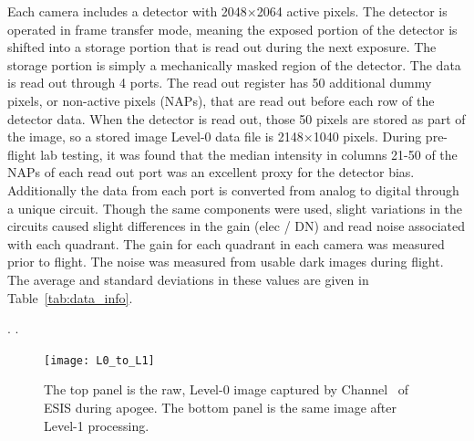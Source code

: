 	    Each camera includes a detector with 2048$\times$2064 active pixels.  The detector is operated in frame transfer mode, meaning the exposed portion of the detector is shifted into a storage portion that is read out during the next exposure. The storage portion is simply a mechanically masked region of the detector. The data is read out through 4 ports.  The read out register has 50 additional dummy pixels, or non-active pixels (NAPs), that are read out before each row of the detector data.  When the detector is read out, those 50 pixels are stored as part of the image, so a stored image Level-0 data file is 2148$\times$1040 pixels.   During pre-flight lab testing, it was found that the median intensity in columns 21-50 of the NAPs of each read out port was an excellent proxy for the detector bias.  Additionally the data from each port is converted from analog to digital through a unique circuit.  Though the same components were used, slight variations in the circuits caused slight differences in the gain (elec / DN) and read  noise associated with each quadrant.  The gain for each quadrant in each camera was measured prior to flight.  The noise was measured from usable dark images during flight.   The average and standard deviations in these values are given in Table~\ref{tab:data_info}.
	   
	    . . 
	    
	    \begin{figure}
	    	\centering
	    	\texttt{[image: L0\_to\_L1]}
	    	\caption{The top panel is the raw, Level-0 image captured by Channel \ of ESIS during apogee. The bottom panel is the same image after Level-1 processing. }
	    	\label{fig:L0_to_L1}
	    \end{figure}
    	
